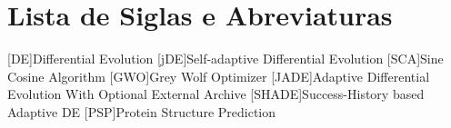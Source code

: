 \chapter*{Lista de Siglas e Abreviaturas}
\begin{acronym}

[DE]{Differential Evolution}
[jDE]{Self-adaptive Differential Evolution}
[SCA]{Sine Cosine Algorithm}
[GWO]{Grey Wolf Optimizer}
[JADE]{Adaptive Differential Evolution With Optional External Archive}
[SHADE]{Success-History based Adaptive DE}
[PSP]{Protein Structure Prediction}

\end{acronym}